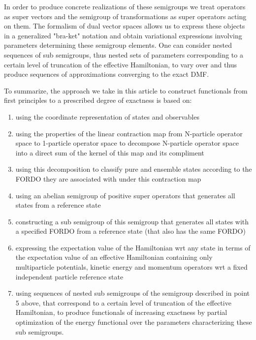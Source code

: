 \documentclass[aps,preprint]{revtex4}%
\begin{document}
In order to produce concrete realizations of these semigroups we treat
operators as super vectors and the semigroup of transformations as super
operators acting on them. The formalism of dual vector spaces allows us to
express these objects in a generalized "bra-ket" notation and obtain
variational expressions involving parameters determining these semigroup
elements. One can consider nested sequences of sub semigroups, thus nested
sets of parameters corresponding to a certain level of truncation of the
effective Hamiltonian, to vary over and thus produce sequences of
approximations converging to the exact DMF.

To summarize, the approach we take in this article to construct functionals
from first principles to a prescribed degree of exactness is based on:

\begin{enumerate}
\item using the coordinate representation of states and observables

\item using the properties of the linear contraction map from N-particle
operator space to 1-particle operator space to decompose N-particle operator
space into a direct sum of the kernel of this map and its compliment

\item using this decomposition to classify pure and ensemble states according
to the FORDO they are associated with under this contraction map

\item using an abelian semigroup of positive super operators that generates
all states from a reference state

\item constructing a sub semigroup of this semigroup that generates all states
with a specified FORDO from a reference state (that also has the same FORDO)

\item expressing the expectation value of the Hamiltonian wrt any state in
terms of the expectation value of an effective Hamiltonian containing only
multiparticle potentials, kinetic energy and momentum operators wrt a fixed
independent particle reference state

\item using sequences of nested sub semigroups of the semigroup described in
point 5 above, that correspond to a certain level of truncation of the
effective Hamiltonian, to produce functionals of increasing exactness by
partial optimization of the energy functional over the parameters
characterizing these sub semigroups.
\end{enumerate}
\end{document}
